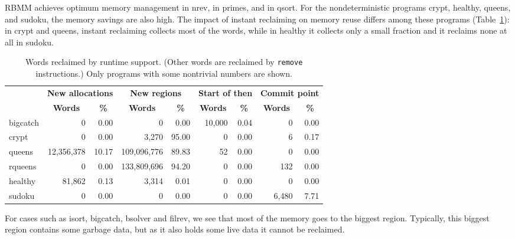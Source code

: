 \documentclass{tlp}
\newcommand{\bench}[1]{{#1}}
\newcommand{\code}[1]{{\tt#1}}
\begin{document}
RBMM achieves optimum memory management
in \bench{nrev}, in \bench{primes}, and in \bench{qsort}.
For the nondeterministic programs \bench{crypt}, \bench{healthy},
\bench{queens}, and \bench{sudoku}, the memory savings are also high.
The impact of instant reclaiming on memory reuse
differs among these programs
(Table~\ref{table:experiment:impact_rts}):
in \bench{crypt} and \bench{queens},
instant reclaiming collects most of the words,
while in \bench{healthy} it collects only a small fraction
and it reclaims none at all in \bench{sudoku}.

\begin{table}[htb]
  \centering
  \small
  \caption{Words reclaimed by runtime support.
  (Other words are reclaimed by \code{remove} instructions.)
  Only programs with some nontrivial numbers are shown.}
  \scriptsize
  \begin{tabular}{l|*{8}{r|}}
    \hline
    \hline
    \multirow{2}{*}{}
    & \multicolumn{2}{c|}{\textbf{New allocations}}
    & \multicolumn{2}{c|}{\textbf{New regions}}
    & \multicolumn{2}{c|}{\textbf{Start of then}}
    & \multicolumn{2}{c|}{\textbf{Commit point}} \\
    & \multicolumn{1}{c}{\textbf{Words}}
    & \multicolumn{1}{c|}{\textbf{\%}}
    & \multicolumn{1}{c}{\textbf{Words}}
    & \multicolumn{1}{c|}{\textbf{\%}}
    & \multicolumn{1}{c}{\textbf{Words}}
    & \multicolumn{1}{c|}{\textbf{\%}}
    & \multicolumn{1}{c}{\textbf{Words}}
    & \multicolumn{1}{c|}{\textbf{\%}} \\
    \hline
    bigcatch  &          0 &  0.00 &           0 &  0.00 & 10,000 & 0.04 &     0 & 0.00 \\
    crypt     &          0 &  0.00 &       3,270 & 95.00 &      0 & 0.00 &     6 & 0.17 \\
    queens    & 12,356,378 & 10.17 & 109,096,776 & 89.83 &     52 & 0.00 &     0 & 0.00 \\
    rqueens   &          0 &  0.00 & 133,809,696 & 94.20 &      0 & 0.00 &   132 & 0.00 \\
    healthy   &     81,862 &  0.13 &       3,314 &  0.01 &      0 & 0.00 &     0 & 0.00 \\
    sudoku    &          0 &  0.00 &           0 &  0.00 &      0 & 0.00 & 6,480 & 7.71 \\
    \hline
    \hline
  \end{tabular}
  \normalsize
  \label{table:experiment:impact_rts}
\end{table}

For cases such as \bench{isort}, \bench{bigcatch},
\bench{bsolver} and \bench{filrev},
we see that most of the memory goes to the biggest region.
Typically, this biggest region contains some garbage data,
but as it also holds some live data it cannot be reclaimed.
\end{document}
